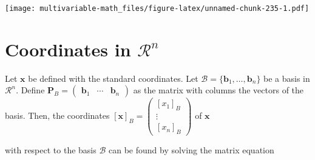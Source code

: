\documentclass[
]{book}
\newenvironment{Shaded}{\begin{snugshade}}{\end{snugshade}}
\newcommand{\DataTypeTok}[1]{\textcolor[rgb]{0.13,0.29,0.53}{#1}}
\newcommand{\DecValTok}[1]{\textcolor[rgb]{0.00,0.00,0.81}{#1}}
\newcommand{\FloatTok}[1]{\textcolor[rgb]{0.00,0.00,0.81}{#1}}
\newcommand{\KeywordTok}[1]{\textcolor[rgb]{0.13,0.29,0.53}{\textbf{#1}}}
\newcommand{\NormalTok}[1]{#1}
\newcommand{\OperatorTok}[1]{\textcolor[rgb]{0.81,0.36,0.00}{\textbf{#1}}}
\newcommand{\StringTok}[1]{\textcolor[rgb]{0.31,0.60,0.02}{#1}}
\theoremstyle{definition}
\theoremstyle{definition}
\theoremstyle{definition}
\theoremstyle{remark}
\begin{document}
\begin{Shaded}
\end{Shaded}

\texttt{[image: multivariable-math\_files/figure-latex/unnamed-chunk-235-1.pdf]}

\hypertarget{coordinates-in-mathcalrn}{%
\section{\texorpdfstring{Coordinates in \(\mathcal{R}^n\)}{Coordinates in \textbackslash mathcal\{R\}\^{}n}}\label{coordinates-in-mathcalrn}}

Let \(\mathbf{x}\) be defined with the standard coordinates. Let \(\mathcal{B} = \{ \mathbf{b}_1, \ldots, \mathbf{b}_n \}\) be a basis in \(\mathcal{R}^n\). Define \(\mathbf{P}_B = \begin{pmatrix} \mathbf{b}_1 & \cdots & \mathbf{b}_n \end{pmatrix}\) as the matrix with columns the vectors of the basis. Then, the coordinates \([\mathbf{x}]_B = \begin{pmatrix} [x_1]_B \\ \vdots \\ [x_n]_B \end{pmatrix}\) of \(\mathbf{x}\)

with respect to the basis \(\mathcal{B}\) can be found by solving the matrix equation
\end{document}
